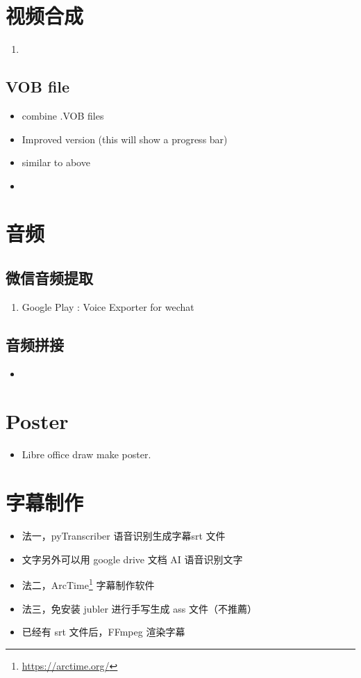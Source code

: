\section{视频合成}
\begin{enumerate}
\item {}
\end{enumerate}

\subsection{VOB file}
\begin{itemize}
\item {} combine .VOB files
\item {} Improved version (this will show a progress bar)
\item {} similar to above
\item {} 
\end{itemize}

\section{音频}
\subsection{微信音频提取}
\begin{enumerate}
\item Google Play : Voice Exporter for wechat
\end{enumerate}

\subsection{音频拼接}
\begin{itemize}
\item {}
\end{itemize}

\section{Poster}
\begin{itemize}
\item {} Libre office draw make poster.
\end{itemize}

\section{字幕制作}
\begin{itemize}
\item 法一，pyTranscriber 语音识别生成字幕srt 文件
\item 文字另外可以用 google drive 文档 AI 语音识别文字
\item 法二，ArcTime\footnote{\url{https://arctime.org/}} 字幕制作软件
\item 法三，免安装 jubler 进行手写生成 ass 文件（不推薦）
\item 已经有 srt 文件后，FFmpeg 渲染字幕
\end{itemize}
